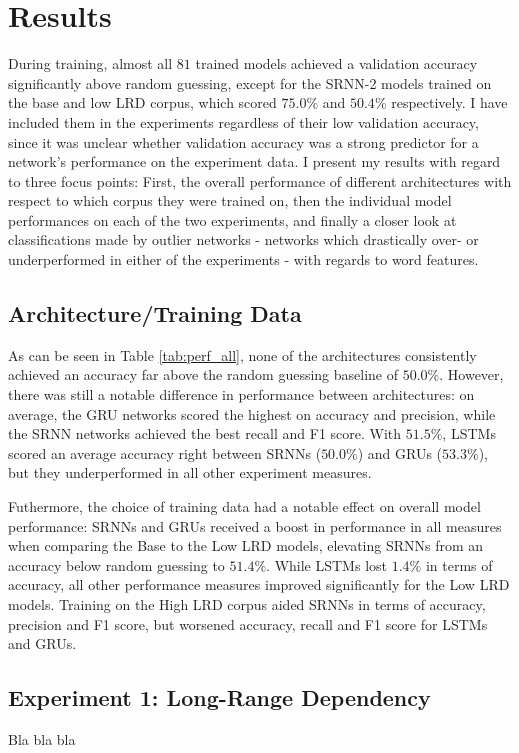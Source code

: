 \section{Results}\label{ch:results}
During training, almost all $81$ trained models achieved a validation accuracy significantly above random guessing, except for the SRNN-2 models trained on the base and low LRD corpus, which scored $75.0\%$ and $50.4\%$ respectively. I have included them in the experiments regardless of their low validation accuracy, since it was unclear whether validation accuracy was a strong predictor for a network's performance on the experiment data. I present my results with regard to three focus points: First, the overall performance of different architectures with respect to which corpus they were trained on, then the individual model performances on each of the two experiments, and finally a closer look at classifications made by outlier networks - networks which drastically over- or underperformed in either of the experiments - with regards to word features.

\subsection{Architecture/Training Data}

As can be seen in Table \ref{tab:perf_all}, none of the architectures consistently achieved an accuracy far above the random guessing baseline of $50.0\%$. However, there was still a notable difference in performance between architectures: on average, the GRU networks scored the highest on accuracy and precision, while the SRNN networks achieved the best recall and F1 score. With $51.5\%$, LSTMs scored an average accuracy right between SRNNs ($50.0\%$) and GRUs ($53.3\%$), but they underperformed in all other experiment measures.

Futhermore, the choice of training data had a notable effect on overall model performance: SRNNs and GRUs received a boost in performance in all measures when comparing the Base to the Low LRD models, elevating SRNNs from an accuracy below random guessing to $51.4\%$. While LSTMs lost $1.4\%$ in terms of accuracy, all other performance measures improved significantly for the Low LRD models. Training on the High LRD corpus aided SRNNs in terms of accuracy, precision and F1 score, but worsened accuracy, recall and F1 score for LSTMs and GRUs.

\subsection{Experiment 1: Long-Range Dependency}\label{resultsLRD}
Bla bla bla

